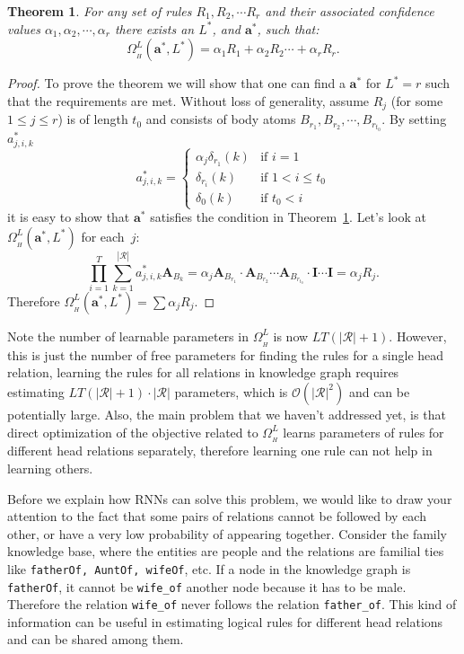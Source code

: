 \documentclass{article}
\newtheorem{theorem}{Theorem}
\newcommand{\mb}[1]{\mathbf{#1}}
\begin{document}
\begin{theorem}
\label{thr:theorem_2}
For any set of rules $R_1, R_2, \cdots R_r$ and their associated confidence values $\alpha_1, \alpha_2, \cdots, \alpha_r$ there exists an $L^*$, and $\bm{a^*}$, such that:
\[
\Omega^L_{\scriptstyle_{H}}(\bm{a^*}, L^*)=\alpha_1 R_1+\alpha_2 R_2 \cdots + \alpha_r R_r.
\]
\end{theorem}
\begin{proof}
To prove the theorem we will show that one can find a $\mb{a^*}$ for $L^* = r$ such that the requirements are met. Without loss of generality, assume $R_j$ (for some $1\leq j \leq r$) is of length $t_0$ and consists of body atoms $B_{r_1}, B_{r_2}, \cdots, B_{r_{t_0}}$. By setting $a^*_{j,i,k}$ 
\begin{equation*}
  a^*_{j,i,k} =
  \begin{cases}
    \alpha_j \delta_{r_1}\scriptstyle{(k)} & \text{if $i = 1$} \\
    \delta_{r_i}\scriptstyle{(k)} & \text{if $1<i\leq t_0$} \\
    \delta_{0}\scriptstyle{(k)} & \text{if $t_0<i$}
  \end{cases}
\end{equation*}
it is easy to show that $\mb{a^*}$ satisfies the condition in Theorem~\ref{thr:theorem_2}. Let's look at $\Omega^L_{\scriptstyle_{H}}(\mb{a^*}, L^*)$ for each~$j$:
\[
     \prod_{i=1}^T  \sum_{k=1}^{|\mathcal{R}|} a^*_{j,i,k} \mb{A}_{B_k} = 
        \alpha_j \mb{A}_{B_{r_1}}\cdot \mb{A}_{B_{r_2}} \cdots \mb{A}_{B_{r_{t_0}}} \cdot \mb{I}\cdots \mb{I} = 
        \alpha_j R_j.
\]
Therefore $\Omega^L_{\scriptstyle_{H}}(\bm{a^*}, L^*)=\sum \alpha_j R_j$.
\end{proof}



Note the number of learnable parameters in $\Omega^L_{\scriptstyle_{H}}$ is now $LT(|\mathcal{R}|+1)$. However, this is just the number of free parameters for finding the rules for a single head relation, learning the rules for all relations in knowledge graph requires estimating $LT(|\mathcal{R}|+1)\cdot |\mathcal{R}|$ parameters, which is $\mathcal{O}(|\mathcal{R}|^2)$ and can be potentially large. Also, the main problem that we haven't addressed yet, is that direct optimization of the objective related to $\Omega^L_{\scriptstyle_{H}}$ learns parameters of rules for different head relations separately, therefore learning one rule can not help in learning others. 

Before we explain how RNNs can solve this problem, we would like to draw your attention to the fact that some pairs of relations cannot be followed by each other, or have a very low probability of appearing together. Consider the family knowledge base, where the entities are people and the relations are familial ties like \texttt{fatherOf, AuntOf, wifeOf}, etc. If a node in the knowledge graph is \texttt{fatherOf}, it cannot be \texttt{wife\_of} another node because it has to be male. Therefore the relation \texttt{wife\_of} never follows the  relation \texttt{father\_of}. This kind of information can be useful in estimating logical rules for different head relations and can be shared among them.
\end{document}
